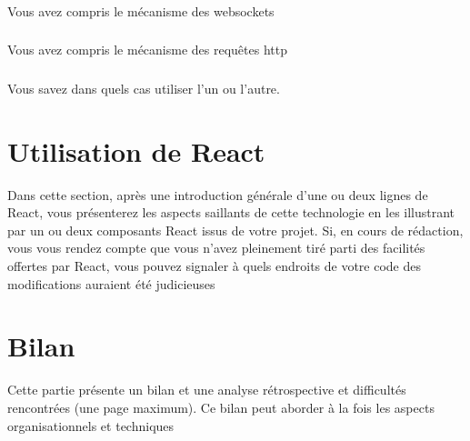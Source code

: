 \documentclass[a4paper]{article}
\begin{document}
\subsubsection{} Vous avez compris le mécanisme des websockets
\subsubsection{} Vous avez compris le mécanisme des requêtes http
\subsubsection{} Vous savez dans quels cas utiliser l’un ou l’autre.

\section{Utilisation de React}

Dans cette section, après une  introduction générale d’une ou deux lignes de React, vous présenterez les aspects saillants de cette technologie en les illustrant par un ou deux composants React issus de votre projet. Si, en cours de rédaction, vous vous rendez compte que vous n’avez pleinement tiré parti des facilités offertes par React, vous pouvez signaler à quels endroits de votre code des 
modifications auraient été judicieuses

\section{Bilan}

Cette partie présente un bilan et une analyse rétrospective et difficultés rencontrées 
(une page maximum). Ce bilan peut aborder à la fois les aspects organisationnels et 
techniques

    
\end{document}

